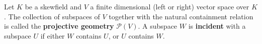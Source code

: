 Let $K$ be a skewfield and $V$ a finite dimensional (left or right) vector space over $K$. The collection of subspaces of $V$ together with the natural containment relation is called the \textbf{projective geometry} $\mathcal{P}(V)$. A subspace $W$ is \textbf{incident} with a subspace $U$ if either $W$ contains $U$, or $U$ contains $W$.

